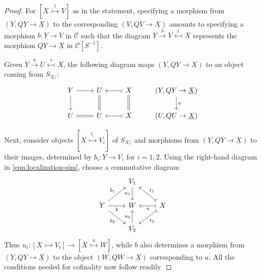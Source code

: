 \begin{proof}
	For $[X\stackrel{t}{\rightarrowtail}V]$ as in the statement, specifying a
	morphism from $(Y,QY\to\underline{X})$ to the corresponding
	$(V,QV\to\underline{X})$ amounts to specifying a morphism $b:Y\to V$ in
	$\mathcal{C}$ such that the diagram
	$Y\xrightarrow{b}V\stackrel{t}{\leftarrowtail}X$ represents the morphism
	$QY\to\underline{X}$ in $\mathcal{C}[S^{-1}]$.

	Given $Y\xrightarrow{a}U\stackrel{s}{\leftarrowtail}X$, the following
	diagram maps $(Y,QY\to\underline{X})$ to an object coming from $S_{X/}$:
	\begin{equation*}\begin{tikzcd}
		Y \arrow[r] \arrow[d] & U \arrow[equal, d] & X \arrow[rightarrowtail, l] \arrow[equal, d] & (Y, QY \to \underline{X}) \arrow[d, "a"] \\
		U \arrow[equal, r] & U & X \arrow[rightarrowtail, l] & (U, QU \to \underline{X})
	\end{tikzcd}\end{equation*}

	Next, consider objects $[X\stackrel{t_i}{\rightarrowtail}V_i]$ of
	$S_{X/}$ and morphisms from $(Y,QY\to\underline{X})$ to their images,
	determined by $b_i:Y\to V_i$ for $i=1,2$. Using the right-hand diagram in
	\eqref{eqn:localization-sim}, choose a commutative diagram
	\[\begin{tikzcd}
		& V_1 \arrow[d, "{u_1}"'] & \\
		Y \arrow[r, "b"'] \arrow[ru, "{b_1}"] \arrow[rd, "{b_2}"'] & W & X \arrow[rightarrowtail, l, "u"] \arrow[rightarrowtail, lu, "{t_1}"'] \arrow[rightarrowtail, ld, "{t_2}"] \\
		& V_2 \arrow[u, "{u_2}"] &
	\end{tikzcd}\]
	Thus $u_i:[X\rightarrowtail V_i]\to
	[X\stackrel{u}{\rightarrowtail}W]$, while $b$ also determines a morphism
	from $(Y,QY\to\underline{X})$ to the object
	$(W,QW\to\underline{X})$ corresponding to $u$. All the conditions needed
	for cofinality now follow readily.
\end{proof}

